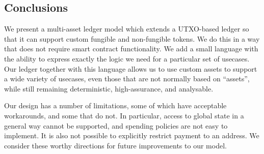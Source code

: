 \subsection{Conclusions}

We present a multi-asset ledger model which extends a UTXO-based ledger so that it can support custom fungible and non-fungible tokens.
We do this in a way that does not require smart contract functionality.
We add a small language with the ability to express exactly the logic we need for a particular set of usecases.
Our \UTXOma{} ledger together with this language allows us to use custom assets to support a wide variety of usecases, even those that are not normally based on ``assets'', while still remaining deterministic, high-assurance, and analysable.

Our design has a number of limitations, some of which have acceptable workarounds, and some that do not.
In particular, access to global state in a general way cannot be supported, and spending policies are not easy to implement.
It is also not possible to explicitly restrict payment to an address.
We consider these worthy directions for future improvements to our model.


%

%
%

